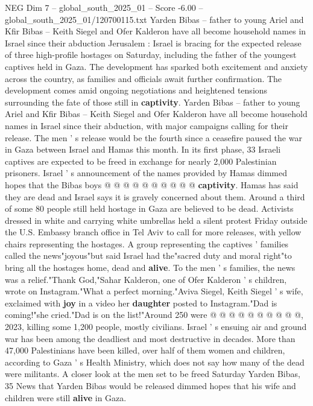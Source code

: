 \begin{textsample}{NEG Dim 7 – global\_south\_2025\_01 – Score -6.00 – global\_south\_2025\_01/120700115.txt}  \label{ex:f7_neg_196}
Yarden Bibas -- father to young Ariel and Kfir Bibas -- Keith Siegel and Ofer Kalderon have all become household names in Israel since their abduction Jerusalem : Israel is bracing for the expected release of three high-profile hostages on Saturday, including the father of the youngest captives held in Gaza.
The development has sparked both excitement and anxiety across the country, as families and officials await further confirmation.
The development comes amid ongoing negotiations and heightened tensions surrounding the fate of those still in \textbf{captivity}.
Yarden Bibas -- father to young Ariel and Kfir Bibas -- Keith Siegel and Ofer Kalderon have all become household names in Israel since their abduction, with major campaigns calling for their release.
The men ' s release would be the fourth since a ceasefire paused the war in Gaza between Israel and Hamas this month.
In its first phase, 33 Israeli captives are expected to be freed in exchange for nearly 2,000 Palestinian prisoners.
Israel ' s announcement of the names provided by Hamas dimmed hopes that the Bibas boys @ @ @ @ @ @ @ @ @ @ \textbf{captivity}.
Hamas has said they are dead and Israel says it is gravely concerned about them.
Around a third of some 80 people still held hostage in Gaza are believed to be dead.
Activists dressed in white and carrying white umbrellas held a silent protest Friday outside the U.S.
Embassy branch office in Tel Aviv to call for more releases, with yellow chairs representing the hostages.
A group representing the captives ' families called the news"joyous"but said Israel had the"sacred duty and moral right"to bring all the hostages home, dead and \textbf{alive}.
To the men ' s families, the news was a relief."Thank God,"Sahar Kalderon, one of Ofer Kalderon ' s children, wrote on Instagram."What a perfect morning."Aviva Siegel, Keith Siegel ' s wife, exclaimed with \textbf{joy} in a video her \textbf{daughter} posted to Instagram."Dad is coming!"she cried."Dad is on the list!"Around 250 were @ @ @ @ @ @ @ @ @ @, 2023, killing some 1,200 people, mostly civilians.
Israel ' s ensuing air and ground war has been among the deadliest and most destructive in decades.
More than 47,000 Palestinians have been killed, over half of them women and children, according to Gaza ' s Health Ministry, which does not say how many of the dead were militants.
A closer look at the men set to be freed Saturday Yarden Bibas, 35 News that Yarden Bibas would be released dimmed hopes that his wife and children were still \textbf{alive} in Gaza.

\end{textsample}
